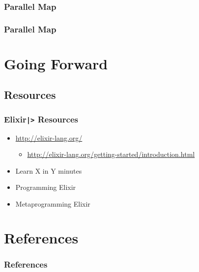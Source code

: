 \documentclass[english]{beamer}
\begin{document}
\begin{frame}[fragile]
\frametitle{Parallel Map}

\end{frame}

\begin{frame}[fragile]
\frametitle{Parallel Map}

\end{frame}

\section*{Going Forward}
\subsection*{Resources}
\begin{frame}
\frametitle{Elixir\texttt{|>} Resources}
\begin{itemize}
\item<2->{\url{http://elixir-lang.org/}}
\begin{itemize}
\item<2->{\url{http://elixir-lang.org/getting-started/introduction.html}}
\end{itemize}
\item<3->{Learn X in Y minutes~\cite{website:learnxiny}}
\item<4->{Programming Elixir~\cite{book:programming_elixir}}
\item<4->{Metaprogramming Elixir~\cite{book:metaprogramming_elixir}}
\end{itemize}
\end{frame}

\section*{References}
\begin{frame}[allowframebreaks]
\frametitle{References}
\nocite{*}
\renewcommand{\refname}{}


\end{frame}

\end{document}
